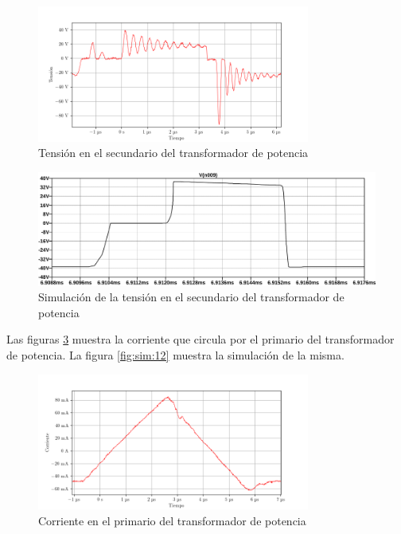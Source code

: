 \begin{figure}[H]
    \centering
    \includegraphics[width=0.8\textwidth]{images/capturas-osciloscopio/17-11-2022/40.png}
    \caption{Tensión en el secundario del transformador de potencia}
    \label{fig:osc:40}
\end{figure}

\begin{figure}[H]
    \centering
    \includegraphics[width=\textwidth]{images/sim/20.pdf}
    \caption{Simulación de la tensión en el secundario del transformador de potencia}
    \label{fig:sim:20}
\end{figure}


Las figuras \ref{fig:osc:24} muestra la corriente que circula por el primario del transformador de potencia. La figura \ref{fig:sim:12} muestra la simulación de la misma.

\begin{figure}[H]
    \centering
    \includegraphics[width=0.8\textwidth]{images/capturas-osciloscopio/17-11-2022/24.png}
    \caption{Corriente en el primario del transformador de potencia}
    \label{fig:osc:24}
\end{figure}

